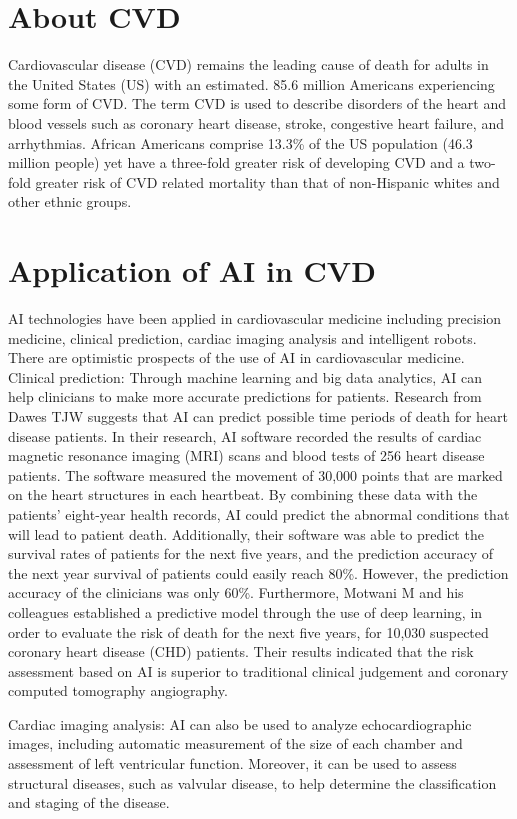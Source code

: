 \documentclass{article}
\begin{document}
\section{About CVD}
Cardiovascular disease (CVD) remains the leading cause of death for adults in the United States (US) with an estimated. 85.6 million Americans experiencing some form of CVD.  The term CVD is used to describe disorders of the heart and blood vessels such as coronary heart disease, stroke, congestive heart failure, and arrhythmias. African Americans comprise 13.3\% of the US population (46.3 million people) yet have a three-fold greater risk of developing CVD and a two-fold greater risk of CVD related mortality than that of non-Hispanic whites and other ethnic groups.

\section{Application of AI in CVD}
AI technologies have been applied in cardiovascular medicine including precision medicine, clinical prediction, cardiac imaging analysis and intelligent robots. There are optimistic prospects of the use of AI in cardiovascular medicine.
Clinical prediction:
Through machine learning and big data analytics, AI can help clinicians to make more accurate predictions for patients. Research from Dawes TJW suggests that AI can predict possible time periods of death for heart disease patients. In their research, AI software recorded the results of cardiac magnetic resonance imaging (MRI) scans and blood tests of 256 heart disease patients. The software measured the movement of 30,000 points that are marked on the heart structures in each heartbeat. By combining these data with the patients' eight-year health records, AI could predict the abnormal conditions that will lead to patient death. Additionally, their software was able to predict the survival rates of patients for the next five years, and the prediction accuracy of the next year survival of patients could easily reach 80\%. However, the prediction accuracy of the clinicians was only 60\%. Furthermore, Motwani M and his colleagues established a predictive model through the use of deep learning, in order to evaluate the risk of death for the next five years, for 10,030 suspected coronary heart disease (CHD) patients. Their results indicated that the risk assessment based on AI is superior to traditional clinical judgement and coronary computed tomography angiography.

Cardiac imaging analysis: 
AI can also be used to analyze echocardiographic images, including automatic measurement of the size of each chamber and assessment of left ventricular function. Moreover, it can be used to assess structural diseases, such as valvular disease, to help determine the classification and staging of the disease.
\end{document}

